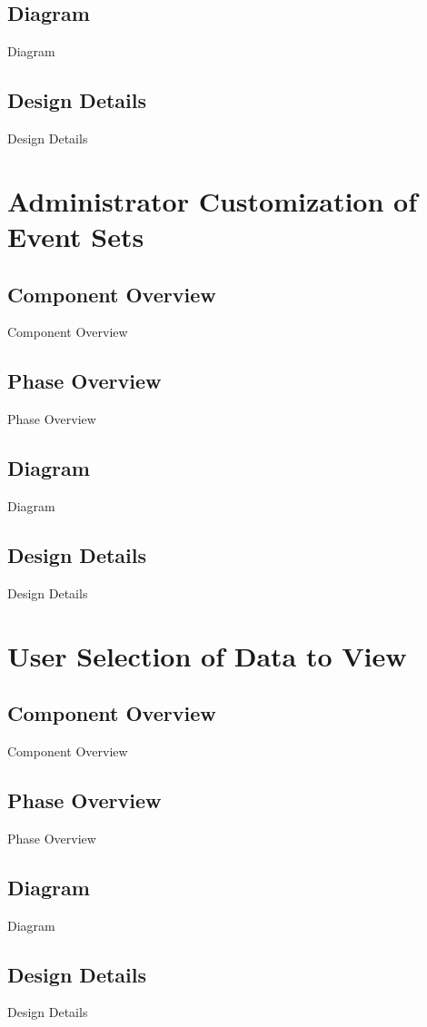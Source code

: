 \subsection{Diagram}
Diagram
\subsection{Design Details}
Design Details

\section{Administrator Customization of Event Sets }

\subsection{Component  Overview}
Component Overview
\subsection{Phase Overview}
Phase Overview
\subsection{Diagram}
Diagram
\subsection{Design Details}
Design Details

\section{User Selection of Data to View }

\subsection{Component  Overview}
Component Overview
\subsection{Phase Overview}
Phase Overview
\subsection{Diagram}
Diagram
\subsection{Design Details}
Design Details